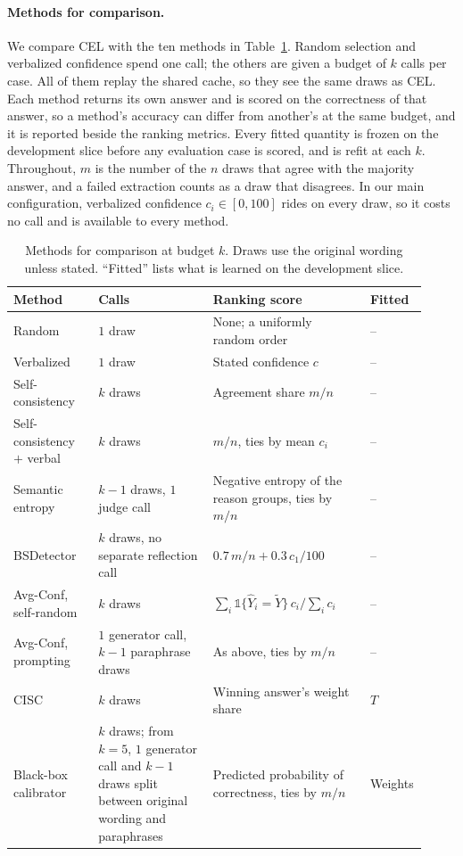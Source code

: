 
\paragraph{Methods for comparison.}
We compare CEL with the ten methods in Table~\ref{tab:comparison}. Random
selection and verbalized confidence spend one call; the others are given a
budget of $k$ calls per case. All of them replay the shared cache, so they
see the same draws as CEL. Each method returns its own answer and is scored
on the correctness of that answer, so a method's accuracy can differ from
another's at the same budget, and it is reported beside the ranking metrics.
Every fitted quantity is frozen on the development slice before any
evaluation case is scored, and is refit at each $k$. Throughout, $m$ is the
number of the $n$ draws that agree with the majority answer, and a failed
extraction counts as a draw that disagrees. In our main configuration,
verbalized confidence $c_i \in [0, 100]$ rides on every draw, so it costs
no call and is available to every method.

\begin{table}[t]
\centering
\small
\caption{Methods for comparison at budget $k$. Draws use the original wording
unless stated. ``Fitted'' lists what is learned on the development slice.}
\label{tab:comparison}
\begin{tabular}{@{}p{0.2\linewidth}p{0.27\linewidth}p{0.37\linewidth}p{0.08\linewidth}@{}}
\toprule
Method & Calls & Ranking score & Fitted \\
\midrule
Random & $1$ draw & None; a uniformly random order & -- \\
Verbalized & $1$ draw & Stated confidence $c$ & -- \\
Self-consistency & $k$ draws & Agreement share $m/n$ & -- \\
Self-consistency $+$ verbal & $k$ draws & $m/n$, ties by mean $c_i$ & -- \\
Semantic entropy & $k-1$ draws, $1$ judge call & Negative entropy of the reason groups, ties by $m/n$ & -- \\
BSDetector & $k$ draws, no separate reflection call & $0.7\, m/n + 0.3\, c_1/100$ & -- \\
Avg-Conf, self-random & $k$ draws & $\sum_i \mathbb{1}\{\hat Y_i = \tilde Y\}\, c_i / \sum_i c_i$ & -- \\
Avg-Conf, prompting & $1$ generator call, $k-1$ paraphrase draws & As above, ties by $m/n$ & -- \\
CISC & $k$ draws & Winning answer's weight share & $T$ \\
Black-box calibrator & $k$ draws; from $k = 5$, $1$ generator call and $k-1$ draws split between original wording and paraphrases & Predicted probability of correctness, ties by $m/n$ & Weights \\
\bottomrule
\end{tabular}
\end{table}

